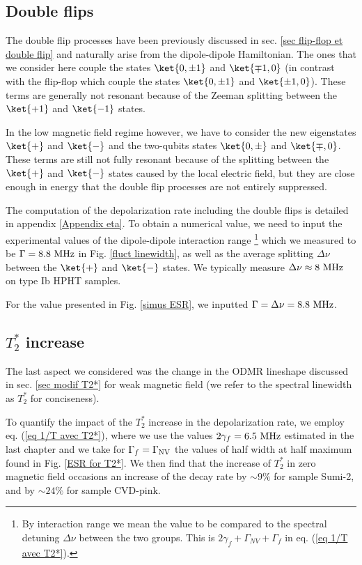 \documentclass[a4paper, 11pt]{report}
\begin{document}
\subsection{Double flips}

The double flip processes have been previously discussed in sec. \ref{sec flip-flop et double flip} and naturally arise from the dipole-dipole Hamiltonian. The ones that we consider here couple the states $\ket{0, \pm 1}$ and $\ket{\mp 1, 0}$ (in contrast with the flip-flop which couple the states $\ket{0, \pm 1}$ and $\ket{\pm 1, 0}$). These terms are generally not resonant because of the Zeeman splitting between the $\ket{+1}$ and $\ket{-1}$ states. 

In the low magnetic field regime however, we have to consider the new eigenstates $\ket{+}$ and $\ket{-}$ and the two-qubits states $\ket{0, \pm}$ and $\ket{\mp, 0}$. These terms are still not fully resonant because of the splitting between the $\ket{+}$ and $\ket{-}$ states caused by the local electric field, but they are close enough in energy that the double flip processes are not entirely suppressed.

The computation of the depolarization rate including the double flips is detailed in appendix \ref{Appendix eta}. To obtain a numerical value, we need to input the experimental values of the dipole-dipole interaction range \footnote{By interaction range we mean the value to be compared to the spectral detuning $\Delta \nu$ between the two groups. This is $2\gamma_f+\Gamma_{NV}+\Gamma_f$ in eq. (\ref{eq 1/T avec T2*}).} which we measured to be $\Gamma=8.8\ \rm MHz$ in Fig. \ref{fluct linewidth}, as well as the average splitting $\Delta \nu$ between the $\ket{+}$ and $\ket{-}$ states. We typically measure $\Delta \nu \approx 8\ \rm MHz$ on type Ib HPHT samples.

For the value presented in Fig. \ref{simus ESR}, we inputted $\Gamma=\Delta \nu=8.8\ \rm MHz$.


\subsection{$T_2^*$ increase}

The last aspect we considered was the change in the ODMR lineshape discussed in sec. \ref{sec modif T2*} for weak magnetic field (we refer to the spectral linewidth as $T_2^*$ for conciseness).

To quantify the impact of the $T_2^*$ increase in the depolarization rate, we employ eq. (\ref{eq 1/T avec T2*}), where we use the values $2\gamma_f = 6.5\ \rm MHz$ estimated in the last chapter and we take for $\Gamma_f=\Gamma_{\rm NV}$ the values of half width at half maximum found in Fig. \ref{ESR for T2*}. We then find that the increase of $T_2^*$ in zero magnetic field occasions an increase of the decay rate by $\sim 9 \%$ for sample Sumi-2, and by $\sim 24 \%$ for sample CVD-pink. 
\end{document}
